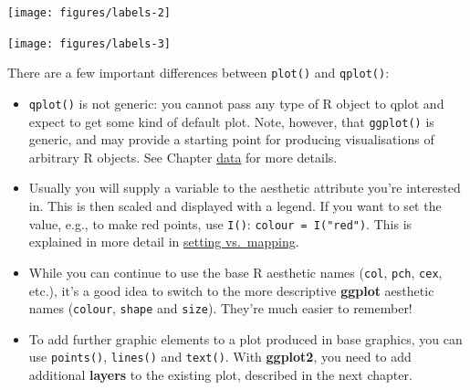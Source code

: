 \begin{flushleft}\texttt{[image: figures/labels-2]} \end{flushleft}

\begin{Shaded}
\begin{Highlighting}[]
\NormalTok{>}\StringTok{ }  \NormalTok{)}
\end{Highlighting}
\end{Shaded}

\begin{flushleft}\texttt{[image: figures/labels-3]} \end{flushleft}


There are a few important differences between \texttt{plot()} and
\texttt{qplot()}:

\begin{itemize}
\item
  \texttt{qplot()} is not generic: you cannot pass any type of R object
  to qplot and expect to get some kind of default plot. Note, however,
  that \texttt{ggplot()} is generic, and may provide a starting point
  for producing visualisations of arbitrary R objects. See Chapter
  \hyperref[cha:data]{data} for more details.
\item
  Usually you will supply a variable to the aesthetic attribute you're
  interested in. This is then scaled and displayed with a legend. If you
  want to set the value, e.g., to make red points, use \texttt{I()}:
  \texttt{colour = I("red")}. This is explained in more detail in
  \hyperref[sub:setting-mapping]{setting vs.~mapping}.
\item
  While you can continue to use the base R aesthetic names
  (\texttt{col}, \texttt{pch}, \texttt{cex}, etc.), it's a good idea to
  switch to the more descriptive \textbf{ggplot} aesthetic names
  (\texttt{colour}, \texttt{shape} and \texttt{size}). They're much
  easier to remember!
\item
  To add further graphic elements to a plot produced in base graphics,
  you can use \texttt{points()}, \texttt{lines()} and \texttt{text()}.
  With \textbf{ggplot2}, you need to add additional \textbf{layers} to
  the existing plot, described in the next chapter.
\end{itemize}
